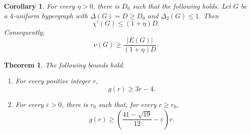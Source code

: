 \documentclass[10pt,a4paper]{amsart}
\newtheorem{theorem}{Theorem}
\newtheorem{corollary}{Corollary}
\newcommand{\Del}{\Delta}
\newcommand{\DelTwo}{\Delta_2}
\begin{document}
\begin{corollary}\label{cor:kahn-rank-four}
For every $\eta>0$, there is $D_0$ such that the following holds.  Let $G$ be
a $4$-uniform hypergraph with $\Del(G)=D\ge D_0$ and
$\DelTwo(G)\le 1$.  Then
\[
  \chi'(G)\le (1+\eta)D.
\]
Consequently,
\[
  \nu(G)\ge \frac{|E(G)|}{(1+\eta)D}.
\]
\end{corollary}

\begin{theorem}\label{thm:main}
The following bounds hold.
\begin{enumerate}
\item[(i)] For every positive integer $r$,
\[
  g(r)\ge 3r-4.
\]
\item[(ii)] For every $\varepsilon>0$, there is $r_0$ such that, for every
$r\ge r_0$,
\[
  g(r)\ge \left(\frac{41-\sqrt{19}}{12}-\varepsilon\right)r.
\]
\end{enumerate}
\end{theorem}
\end{document}
